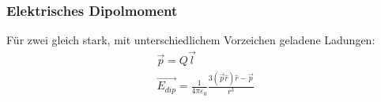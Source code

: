 \subsubsection{Elektrisches Dipolmoment}
    Für zwei gleich stark, mit unterschiedlichem Vorzeichen geladene Ladungen:
    \begin{align}
        \overrightarrow{p} = Q \overrightarrow{l}\\
        \overrightarrow{E_{dip}} = \frac{1}{4 \pi \varepsilon_0} \frac{3 (\overrightarrow{p} \hat{r}) \hat{r} - \overrightarrow{p}}{r^3}
    \end{align}
